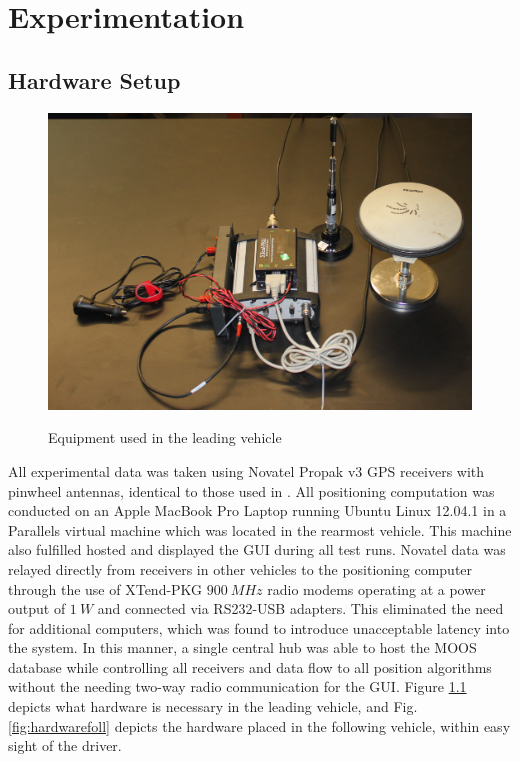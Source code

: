\documentclass[12pt]{report}
\begin{document}
\chapter{Experimentation}
\label{chap:exper}

\section{Hardware Setup} \label{sec:hardware}

\begin{figure}[ht] \centering \label{fig:hardwarelead}
    \includegraphics[width=5in]{./figs/lead_hardware.jpg}
    \caption{Equipment used in the leading vehicle}
\end{figure}

All experimental data was taken using Novatel Propak v3 GPS receivers with pinwheel antennas, identical to those used in \cite{scottthesis}. All positioning computation was conducted on an Apple MacBook Pro Laptop running Ubuntu Linux 12.04.1 in a Parallels virtual machine which was located in the rearmost vehicle. This machine also fulfilled hosted and displayed the GUI during all test runs. Novatel data was relayed directly from receivers in other vehicles to the positioning computer through the use of XTend-PKG $900~MHz$ radio modems operating at a power output of $1~W$ and connected via RS232-USB adapters. This eliminated the need for additional computers, which was found to introduce unacceptable latency into the system. In this manner, a single central hub was able to host the MOOS database while controlling all receivers and data flow to all position algorithms without the needing two-way radio communication for the GUI. Figure \ref{fig:hardwarelead} depicts what hardware is necessary in the leading vehicle, and Fig. \ref{fig:hardwarefoll} depicts the hardware placed in the following vehicle, within easy sight of the driver.
\end{document}

